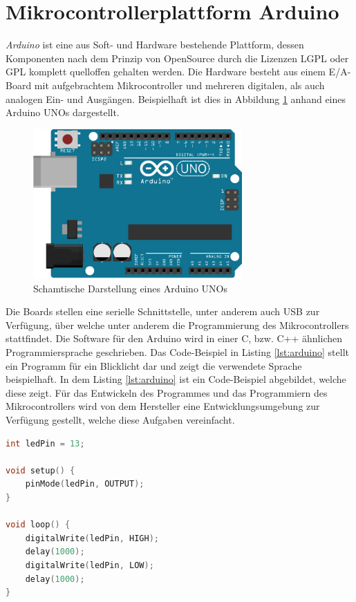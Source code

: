 \section{Mikrocontrollerplattform Arduino}
\textit{Arduino} ist eine aus Soft- und Hardware bestehende Plattform, dessen Komponenten nach dem Prinzip von OpenSource durch die Lizenzen \ac{LGPL} oder \ac{GPL} komplett quelloffen gehalten werden.
Die Hardware besteht aus einem E/A-Board mit aufgebrachtem Mikrocontroller und mehreren digitalen, als auch analogen Ein- und Ausgängen.
Beispielhaft ist dies in Abbildung \ref{fig:arduino_uno_schema} anhand eines Arduino UNOs dargestellt.
\begin{figure}[H]
	\centering
	\includegraphics[width=8cm]{images/chapter/02/arduino_uno.png}
	\caption{Schamtische Darstellung eines Arduino UNOs}
	\label{fig:arduino_uno_schema}
\end{figure}
Die Boards stellen eine serielle Schnittstelle, unter anderem auch \ac{USB} zur Verfügung, über welche unter anderem die Programmierung des Mikrocontrollers stattfindet.
Die Software für den Arduino wird in einer C, bzw. C++ ähnlichen Programmiersprache geschrieben.
Das Code-Beispiel in Listing \ref{lst:arduino} stellt ein Programm für ein Blicklicht dar und zeigt die verwendete Sprache beispielhaft.
In dem Listing \ref{lst:arduino} ist ein Code-Beispiel abgebildet, welche diese zeigt.
Für das Entwickeln des Programmes und das Programmiern des Mikrocontrollers wird von dem Hersteller eine Entwicklungsumgebung zur Verfügung gestellt, welche diese Aufgaben vereinfacht.

\begin{lstlisting}[language=C, label={lst:arduino}, caption=Beispiel-Code eines Blinklichtes für den Arduino]
int ledPin = 13;

void setup() {
    pinMode(ledPin, OUTPUT);
}

void loop() {
    digitalWrite(ledPin, HIGH);
    delay(1000);
    digitalWrite(ledPin, LOW);
    delay(1000);
}
\end{lstlisting}

